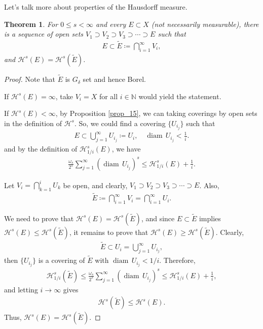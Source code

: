 \documentclass[11pt]{book}
\newtheorem{theorem}{Theorem}[chapter]
\theoremstyle{definition}
\numberwithin{equation}{chapter}
\def\H{{\mathcal H}}
\def\diam{{\operatorname{diam}\,}}
\begin{document}
\medskip

Let's talk more about properties of the Hausdorff measure.

\medskip

\begin{theorem}\label{theorem_121}
For $0 \leq s < \infty$ and every $E \subset X$ (not necessarily measurable), there is a sequence of open sets $V_1 \supset V_2 \supset V_3 \supset \cdots \supset E$ such that 
\begin{align*}
    E \subset \widetilde{E} \coloneqq \bigcap^\infty_{i=1} V_i,
\end{align*}
and $\H^s(E) = \H^s (\widetilde{E})$.
\end{theorem}
\begin{proof}
Note that $\widetilde{E}$ is $G_\delta$ set and hence Borel.

If $\H^s(E) = \infty$, take $V_i = X$ for all $i \in \mathbb{N}$ would yield the statement.

If $\H^s(E) < \infty$, by Proposition \ref{prop_15}, we can taking coverings by open sets in the definition of $\H^s$. So, we could find a covering $\{U_{i_j}\}$ such that
\begin{align*}
    E \subset \bigcup^\infty_{j=1} U_{i_j} \coloneqq U_i, \quad \diam U_{i_j} < \frac{1}{i}.
\end{align*}
and by the definition of $\H^s_{1/i} (E)$, we have
\begin{align*}
    \frac{\omega_s}{2^s} \sum^\infty_{j=1} \left(\diam U_{i_j}\right)^s \leq \H^s_{1/i} (E) + \frac{1}{i}.
\end{align*}

Let $V_i = \bigcap^i_{k=1}U_k$ be open, and clearly, $V_1 \supset V_2 \supset V_3 \supset \cdots \supset E$. Also, 
\begin{align*}
    \widetilde{E} \coloneqq \bigcap^\infty_{i=1} V_i = \bigcap^\infty_{i=1} U_i.
\end{align*}

We need to prove that $\H^s(E) = \H^s (\widetilde{E})$, and since $E \subset \widetilde{E}$ implies $\H^s(E) \leq \H^s(\widetilde{E})$, it remains to prove that $\H^s(E) \geq \H^s(\widetilde{E})$. Clearly,
\begin{align*}
    \widetilde{E} \subset U_i = \bigcup^\infty_{j=1} U_{i_j},
\end{align*}
then $\{U_{i_j}\}$ is a covering of $\widetilde{E}$ with $\diam U_{i_j} < 1/i$. Therefore,
\begin{align*}
    \H^s_{1/i}(\widetilde{E}) \leq \frac{\omega_s}{2^s} \sum^\infty_{j=1} \left(\diam U_{i_j}\right)^s \leq \H^s_{1/i}(E) + \frac{1}{i},
\end{align*}
and letting $i \to \infty$ gives
\begin{align*}
    \H^s(\widetilde{E}) \leq \H^s(E).
\end{align*}
Thus, $\H^s(E) = \H^s (\widetilde{E})$.
\end{proof}
\end{document}

